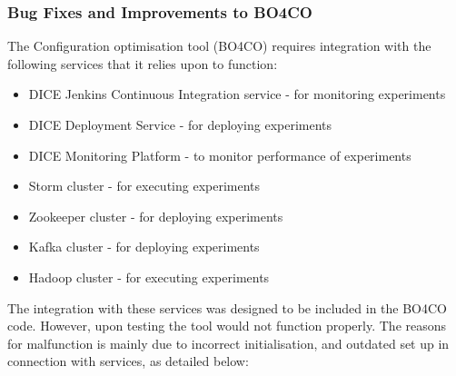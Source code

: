 \subsubsection{Bug Fixes and Improvements to BO4CO}
The Configuration optimisation tool (BO4CO) requires integration with the following services that it relies upon to function:
\begin{itemize}
\item DICE Jenkins Continuous Integration service - for monitoring experiments
\item DICE Deployment Service - for deploying experiments
\item DICE Monitoring Platform - to monitor performance of experiments
\item Storm cluster - for executing experiments
\item Zookeeper cluster - for deploying experiments
\item Kafka cluster - for deploying experiments
\item Hadoop cluster - for executing experiments
\end{itemize}
The integration with these services was designed to be included in the BO4CO code. However, upon testing the tool would not function properly. The reasons for malfunction is mainly due to incorrect initialisation, and outdated set up in connection with services, as detailed below:
